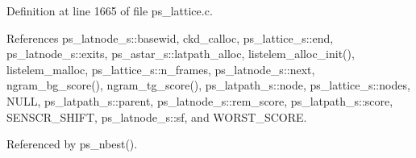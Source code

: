 \-Definition at line 1665 of file ps\-\_\-lattice.\-c.



\-References ps\-\_\-latnode\-\_\-s\-::basewid, ckd\-\_\-calloc, ps\-\_\-lattice\-\_\-s\-::end, ps\-\_\-latnode\-\_\-s\-::exits, ps\-\_\-astar\-\_\-s\-::latpath\-\_\-alloc, listelem\-\_\-alloc\-\_\-init(), listelem\-\_\-malloc, ps\-\_\-lattice\-\_\-s\-::n\-\_\-frames, ps\-\_\-latnode\-\_\-s\-::next, ngram\-\_\-bg\-\_\-score(), ngram\-\_\-tg\-\_\-score(), ps\-\_\-latpath\-\_\-s\-::node, ps\-\_\-lattice\-\_\-s\-::nodes, \-N\-U\-L\-L, ps\-\_\-latpath\-\_\-s\-::parent, ps\-\_\-latnode\-\_\-s\-::rem\-\_\-score, ps\-\_\-latpath\-\_\-s\-::score, \-S\-E\-N\-S\-C\-R\-\_\-\-S\-H\-I\-F\-T, ps\-\_\-latnode\-\_\-s\-::sf, and \-W\-O\-R\-S\-T\-\_\-\-S\-C\-O\-R\-E.



\-Referenced by ps\-\_\-nbest().

